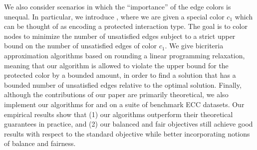 We also consider scenarios in which the ``importance'' of the edge colors is unequal. In particular, we
introduce \pcECC{}, where we are given a special color $c_1$ which can be thought of as encoding a protected interaction type. The goal is to color nodes to minimize the number of unsatisfied edges subject to a strict upper bound on the number of unsatisfied edges of color $c_1$. We give bicriteria approximation algorithms based on rounding a linear programming relaxation, meaning that our algorithm is allowed to violate the upper bound for the protected color by a bounded amount, in order to find a solution that has a bounded number of unsatisfied edges relative to the optimal solution.
%
Finally, although the contributions of our paper are primarily theoretical, we also implement our algorithms for \cfminECC{} and \pcECC{} on a suite of benchmark ECC datasets. Our empirical results show that (1) our algorithms outperform their theoretical guarantees in practice, and (2) our balanced and fair objectives still achieve good results with respect to the standard \minecc{} objective while better incorporating notions of balance and fairness.

